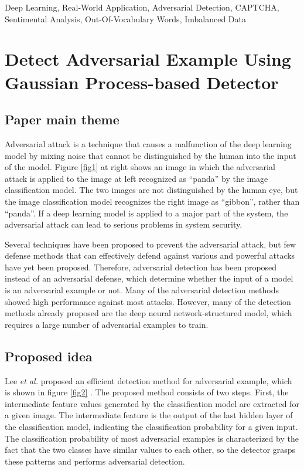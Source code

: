 \documentclass{ieeeaccess}
\begin{document}
\begin{keywords}
Deep Learning, Real-World Application, Adversarial Detection, CAPTCHA, Sentimental Analysis, Out-Of-Vocabulary Words, Imbalanced Data
\end{keywords}

\titlepgskip=-15pt

\maketitle

\clearpage
\section{Detect Adversarial Example Using Gaussian Process-based Detector}
\label{first}
\subsection{Paper main theme}
Adversarial attack is a technique that causes a malfunction of the deep learning model by mixing noise that cannot be distinguished by the human into the input of the model. 
Figure \ref{fig1} at right shows an image in which the adversarial attack is applied to the image at left recognized as “panda” by the image classification model. 
The two images are not distinguished by the human eye, but the image classification model recognizes the right image as “gibbon”, rather than “panda”. 
If a deep learning model is applied to a major part of the system, the adversarial attack can lead to serious problems in system security.

Several techniques have been proposed to prevent the adversarial attack, but few defense methods that can effectively defend against various and powerful attacks have yet been proposed. 
Therefore, adversarial detection has been proposed instead of an adversarial defense, which determine whether the input of a model is an adversarial example or not. 
Many of the adversarial detection methods showed high performance against most attacks. 
However, many of the detection methods already proposed are the deep neural network-structured model, which requires a large number of adversarial examples to train.

\subsection{Proposed idea}
Lee \textit{et al.} proposed an efficient detection method for adversarial example, which is shown in figure \ref{fig2} \cite{paper1}.
The proposed method consists of two steps. First, the intermediate feature values generated by the classification model are extracted for a given image. 
The intermediate feature is the output of the last hidden layer of the classification model, indicating the classification probability for a given input. 
The classification probability of most adversarial examples is characterized by the fact that the two classes have similar values to each other, so the detector grasps these patterns and performs adversarial detection.
\end{document}
